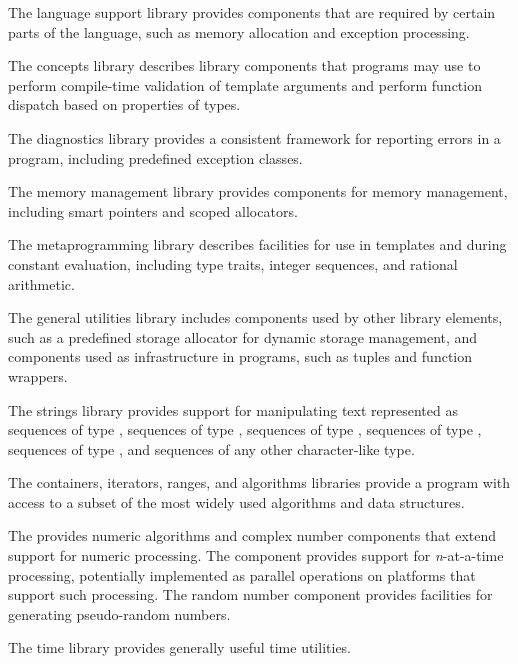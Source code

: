\pnum
The language support library provides components that are
required by certain parts of the \Cpp{} language,
such as memory allocation and
exception processing.

\pnum
The concepts library describes library components that \Cpp{}
programs may use to perform compile-time validation of template arguments and
perform function dispatch based on properties of types.

\pnum
The diagnostics library provides a consistent framework for
reporting errors in a \Cpp{} program, including predefined exception classes.

\pnum
The memory management library provides components for
memory management, including smart pointers and scoped allocators.

\pnum
The metaprogramming library describes facilities
for use in templates and during constant evaluation,
including type traits, integer sequences, and rational arithmetic.

\pnum
The general utilities library includes components used
by other library elements, such as a predefined storage allocator for dynamic
storage management, and components used
as infrastructure
in \Cpp{} programs,
such as tuples and function wrappers.

\pnum
The strings library provides support for manipulating text represented
as sequences of type ,
sequences of type ,
sequences of type ,
sequences of type ,
sequences of type ,
and sequences of any other character-like type.

\pnum
The containers, iterators, ranges,
and algorithms libraries provide a \Cpp{} program with access
to a subset of the most widely used algorithms and data structures.

\pnum
The  provides
numeric algorithms and complex number components that extend support for numeric processing.
The
component provides support for
\textit{n}-at-a-time
processing,
potentially implemented as parallel operations on platforms that support such processing.
The random number component provides facilities for generating pseudo-random numbers.

\pnum
The time library provides
generally useful time utilities.

